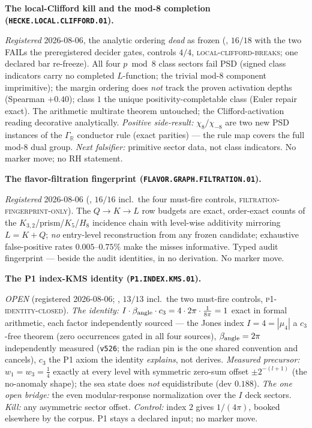 \documentclass[11pt,a4paper]{article}
\newcommand{\cthree}{c_3}
\begin{document}
\par\smallskip\noindent\textbf{The local-Clifford kill and the
mod-8 completion (\texttt{HECKE.LOCAL.CLIFFORD.01}).}
{\sloppy
\emph{Registered} 2026-08-06, the analytic ordering \emph{dead}
as frozen (, $16/18$ with
the two FAILs the preregistered decider gates, controls $4/4$,
\textsc{local-clifford-breaks}; one declared bar re-freeze).
All four $p\bmod8$ class sectors fail PSD (signed class
indicators carry no completed $L$-function; the trivial mod-8
component imprimitive); the margin ordering does \emph{not} track
the proven activation depths (Spearman $+0.40$); class $1$ the
unique positivity-completable class (Euler repair exact).  The
arithmetic multirate theorem untouched; the Clifford-activation
reading decorative analytically.  \emph{Positive side-result:}
$\chi_8/\chi_{-8}$ are two new PSD instances of the
$\Gamma_{\mathbb R}$ conductor rule (exact parities) --- the rule
map covers the full mod-8 dual group.  \emph{Next falsifier:}
primitive sector data, not class indicators.  No marker move; no
RH statement.\par}

\par\smallskip\noindent\textbf{The flavor-filtration fingerprint
(\texttt{FLAVOR.GRAPH.FILTRATION.01}).}
{\sloppy
\emph{Registered} 2026-08-06
(, $16/16$ incl.\ the
four must-fire controls, \textsc{filtration-fingerprint-only}).
The $Q\to K\to L$ row budgets are exact, order-exact counts of
the $K_{3,2}$/prism/$K_5$/$H_8$ incidence chain with level-wise
additivity mirroring $L=K+Q$; \emph{no} entry-level
reconstruction from any frozen candidate; exhaustive
false-positive rates $0.005$--$0.75\%$ make the misses
informative.  Typed audit fingerprint --- beside the audit
identities, in no derivation.  No marker move.\par}

\par\smallskip\noindent\textbf{The P1 index-KMS identity
(\texttt{P1.INDEX.KMS.01}).}
{\sloppy
\emph{OPEN} (registered 2026-08-06;
, $13/13$ incl.\ the two must-fire
controls, \textsc{p1-identity-closed}).  \emph{The identity:}
$I\cdot\beta_{\rm angle}\cdot\cthree=4\cdot2\pi\cdot
\tfrac1{8\pi}=1$ exact in formal arithmetic, each factor
independently sourced --- the Jones index $I=4=|\mu_4|$ a
$\cthree$-free theorem (zero occurrences gated in all four
sources), $\beta_{\rm angle}=2\pi$ independently measured
(\texttt{v526}; the radian pin is the one shared convention and
cancels), $\cthree$ the P1 axiom the identity \emph{explains},
not derives.  \emph{Measured precursor:} $w_1=w_3=\tfrac14$
exactly at every level with symmetric zero-sum offset
$\pm2^{-(l+1)}$ (the no-anomaly shape); the sea state does
\emph{not} equidistribute (dev $0.188$).  \emph{The one open
bridge:} the even modular-response normalization over the $I$
deck sectors.  \emph{Kill:} any asymmetric sector offset.
\emph{Control:} index $2$ gives $1/(4\pi)$, booked elsewhere by
the corpus.  P1 stays a declared input; no marker move.\par}
\end{document}

